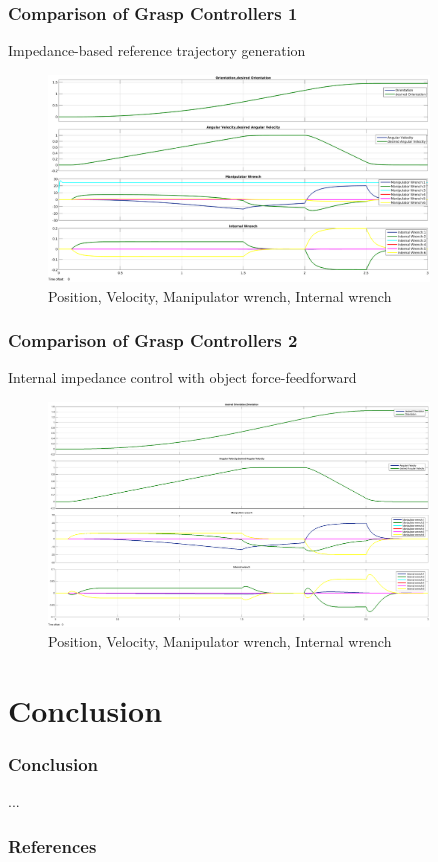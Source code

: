 \documentclass[student]{ITRslides}
\begin{document}
\begin{frame}
	\frametitle{Comparison of Grasp Controllers 1}
Impedance-based reference trajectory generation \cite{Caccavale_01}
 \begin{figure}[htb]
			\centering
			\includegraphics[width=0.9\textwidth]{Caccavaleorientation.eps}
			\caption{Position, Velocity, Manipulator wrench, Internal wrench}
\end{figure}
\end{frame}

\begin{frame}
	\frametitle{Comparison of Grasp Controllers 2}
Internal impedance control with object force-feedforward \cite{DePascali_15}
 \begin{figure}[htb]
			\centering
			\includegraphics[width=0.9\textwidth]{Depascaliorientation.eps}
			\caption{Position, Velocity, Manipulator wrench, Internal wrench}
\end{figure}
\end{frame}

\section{Conclusion}

\begin{frame}
	\frametitle{Conclusion}
	...
\end{frame}
\appendix
\begin{frame}[allowframebreaks]
	\frametitle{References}
	\printbibliography
\end{frame}
\end{document}
